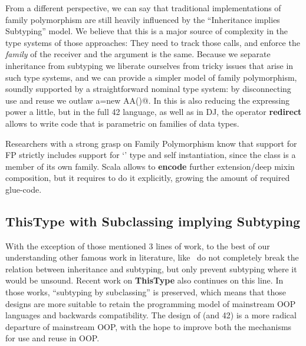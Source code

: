 From a different perspective, we can say that traditional
implementations of family polymorphism are still heavily influenced by
the ``Inheritance implies Subtyping'' model.
We believe that this is a major source of complexity in the type
systems of those approaches:
They need to track those calls, and enforce the \emph{family} of the receiver and the argument is the same.
Because we separate inheritance from subtyping we liberate ourselves
from tricky issues that arise in such type systems, and we can
provide a simpler model of family polymorphism, soundly supported by 
a straightforward nominal type system:
by disconnecting use and reuse we outlaw \Q@A a=new AA()@.
In \name this is also reducing the expressing power a little, but
in the full 42 language, as well as in DJ, the operator \textbf{redirect} allows to write code that is parametric on families of data types.


Researchers with a strong grasp on Family
Polymorphism know that support for FP strictly includes
support for `\Q@This@' type and self instantiation, since the
class is a member of its own family.
Scala allows to \textbf{encode} further extension/deep mixin composition,
but it requires to do it explicitly, growing the amount of required glue-code.

\subsection{ThisType with Subclassing implying Subtyping}
With the exception of those mentioned 3 lines of work, to the best of our understanding
other famous work in literature, like~\cite{odersky2008programming,nystrom2006j}
do not completely break the relation between inheritance and subtyping, but only prevent subtyping where 
it would be unsound.
Recent work on {\bf ThisType} \cite{Saito:2009,ryu16ThisType}
also continues on this line.
In those works, ``subtyping by subclassing'' is preserved, which means
that those designs are more suitable to retain the programming model
of mainstream OOP languages and backwards compatibility. The design 
of \name (and 42) is a more radical departure of mainstream OOP, with
the hope to improve both the mechanisms for use and reuse in OOP.



